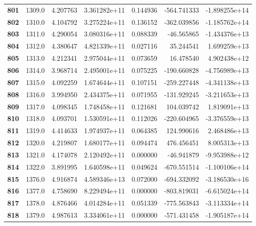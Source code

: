\documentclass{report}[12pt]
\begin{document}
\begin{center}
\begin{tabular}{lrrrrrr}
\textbf{801 } &         1309.0 &   4.207763 &  3.361282e+11 &    0.144936 &  -564.741333 & -1.898255e+14 \\
\textbf{802 } &         1310.0 &   4.104792 &  3.275224e+11 &    0.136152 &  -362.039856 & -1.185762e+14 \\
\textbf{803 } &         1311.0 &   4.290054 &  3.080316e+11 &    0.088339 &   -46.565865 & -1.434376e+13 \\
\textbf{804 } &         1312.0 &   4.380647 &  4.821339e+11 &    0.027116 &    35.244541 &  1.699259e+13 \\
\textbf{805 } &         1313.0 &   4.212341 &  2.975044e+11 &    0.073659 &    16.478540 &  4.902438e+12 \\
\textbf{806 } &         1314.0 &   3.968714 &  2.495001e+11 &    0.075225 &  -190.660828 & -4.756989e+13 \\
\textbf{807 } &         1315.0 &   4.092259 &  1.674644e+11 &    0.107151 &  -259.227448 & -4.341138e+13 \\
\textbf{808 } &         1316.0 &   3.994950 &  2.434375e+11 &    0.071955 &  -131.929245 & -3.211653e+13 \\
\textbf{809 } &         1317.0 &   4.098345 &  1.748458e+11 &    0.121681 &   104.039742 &  1.819091e+13 \\
\textbf{810 } &         1318.0 &   4.093701 &  1.530591e+11 &    0.112026 &  -220.604965 & -3.376559e+13 \\
\textbf{811 } &         1319.0 &   4.414633 &  1.974937e+11 &    0.064385 &   124.990616 &  2.468486e+13 \\
\textbf{812 } &         1320.0 &   4.219807 &  1.680177e+11 &    0.094474 &   476.456451 &  8.005313e+13 \\
\textbf{813 } &         1321.0 &   4.174078 &  2.120492e+11 &    0.000000 &   -46.941879 & -9.953988e+12 \\
\textbf{814 } &         1322.0 &   3.891995 &  1.640598e+11 &    0.049624 &  -670.551514 & -1.100106e+14 \\
\textbf{815 } &         1376.0 &   4.916874 &  4.589346e+13 &    0.072000 &  -694.332092 & -3.186530e+16 \\
\textbf{816 } &         1377.0 &   4.758690 &  8.229494e+11 &    0.000000 &  -803.819031 & -6.615024e+14 \\
\textbf{817 } &         1378.0 &   4.876466 &  4.014284e+11 &    0.051339 &  -775.563843 & -3.113334e+14 \\
\textbf{818 } &         1379.0 &   4.987613 &  3.334061e+11 &    0.000000 &  -571.431458 & -1.905187e+14 \\

\end{tabular}
\end{center}
\end{document}
